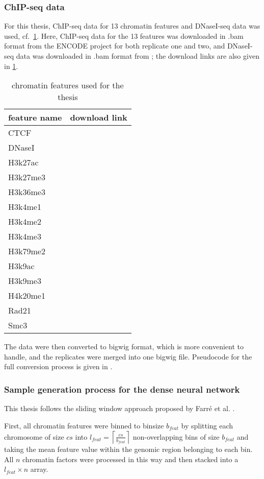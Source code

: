 \subsubsection{ChIP-seq data} \label{sec:methods:chipseq}
For this thesis, ChIP-seq data for 13 chromatin features and DNaseI-seq data was used, cf.~\cref{tab:methods:csdata}.
Here, ChIP-seq data for the 13 features was downloaded in .bam format from the ENCODE project \xxx for both replicate one and two,
and DNaseI-seq data was downloaded in .bam format from \xxx; the download links are also given in \cref{tab:methods:csdata}.
\begin{table}[ht!]
\centering
 \begin{tabular}{ll}
 \hline
  feature name & download link \\  \hline
  CTCF & \\
  DNaseI &\\
  H3k27ac & \\
  H3k27me3 &\\
  H3k36me3 &\\
  H3k4me1 &\\
  H3k4me2 &\\
  H3k4me3 &\\
  H3k79me2 &\\
  H3k9ac &\\
  H3k9me3 &\\
  H4k20me1 &\\
  Rad21 &\\
  Smc3 & \\ \hline
 \end{tabular}
 \caption{chromatin features used for the thesis} \label{tab:methods:csdata}
\end{table}

The data were then converted to bigwig format, which is more convenient to handle, and the replicates were merged into 
one bigwig file. Pseudocode for the full conversion process is given in \xxx.

\subsubsection{Sample generation process for the dense neural network} \label{sec:methods:sample_gen}
This thesis follows the sliding window approach proposed by Farr\'e et al. \cite{Farre2018a}.

First, all chromatin features were binned to binsize $b_\mathit{feat}$ by splitting each chromosome of size $cs$ into 
$l_\mathit{feat}=\left \lceil{\frac{cs}{b_\mathit{feat}}}\right \rceil$ non-overlapping bins of size $b_\mathit{feat}$
and taking the mean feature value within the genomic region belonging to each bin.
All $n$ chromatin factors were processed in this way and then stacked into a $l_\mathit{feat} \times n$ array.

